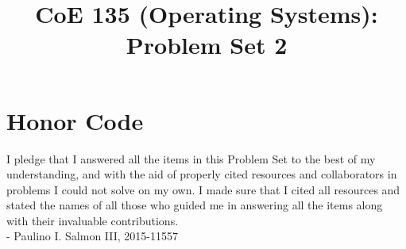 \documentclass[conference]{IEEEtran}
\newcommand\tab[1][0.5cm]{\hspace*{#1}}
\begin{document}
\title{CoE 135 (Operating Systems): Problem Set 2\\
}

\author{
	}		
\maketitle

\section{Honor Code}
I pledge that I answered all the items in this Problem Set to the best of my understanding,
and with the aid of properly cited resources and collaborators in problems I could not solve on my
own. I made sure that I cited all resources and stated the names of all those who guided me in
answering all the items along with their invaluable contributions. \\
\tab - Paulino I. Salmon III, 2015-11557

\end{document}
